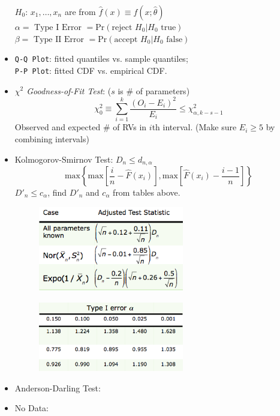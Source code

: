 \documentclass[10pt, twocolumn]{article}
\begin{document}
\begin{itemize}
$H_0$: $x_1,\dots,x_n$ are from $\hat{f}(x)\equiv f(x;\hat{\theta})$ \\
$\alpha=\text{ Type I Error }=\text{Pr}(\text{reject } H_0|H_0 \text{ true})$ \\ 
$\beta=\text{ Type II Error }=\text{Pr}(\text{accept } H_0|H_0 \text{ false})$
\item \texttt{Q-Q Plot}: fitted quantiles vs. sample quantiles; \\
\texttt{P-P Plot}: fitted CDF vs. empirical CDF.
\item \emph{$\chi^2$ Goodness-of-Fit Test}: ($s$ is \# of parameters)
\[ \chi_0^2 \equiv \sum_{i=1}^k \frac{(O_i-E_i)^2}{E_i} \leq \chi_{\alpha, k-s-1}^2 \]
Observed and expected \# of RVs in $i$th interval. 
(Make sure $E_i \geq 5$ by combining intervals)
\item Kolmogorov-Smirnov Test: $D_n \leq d_{n,\alpha}$
\[ \text{max}\left\{\text{max}\left[\frac{i}{n}-\hat{F}(x_i)\right], \text{max}\left[\hat{F}(x_i)-\frac{i-1}{n}\right]\right\} \]
$D'_n \leq c_{\alpha}$, find $D'_n$ and $c_{\alpha}$ from tables above.
\begin{figure}[!h]
\centering
\includegraphics[width=2.5in]{ks01}
\end{figure}
\begin{figure}[!h]
\centering
\includegraphics[width=2.5in]{ks02}
\end{figure}
\item Anderson-Darling Test: 
\item No Data: 
\end{itemize}
\end{document}
